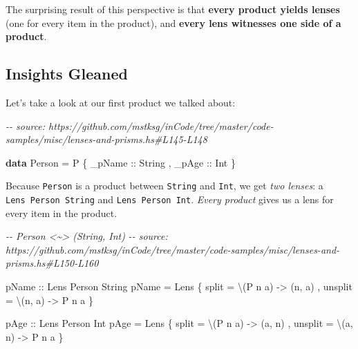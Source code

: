 \documentclass[]{article}
\newenvironment{Shaded}{}{}
\newcommand{\CommentTok}[1]{\textcolor[rgb]{0.38,0.63,0.69}{\textit{#1}}}
\newcommand{\DataTypeTok}[1]{\textcolor[rgb]{0.56,0.13,0.00}{#1}}
\newcommand{\KeywordTok}[1]{\textcolor[rgb]{0.00,0.44,0.13}{\textbf{#1}}}
\newcommand{\NormalTok}[1]{#1}
\newcommand{\OtherTok}[1]{\textcolor[rgb]{0.00,0.44,0.13}{#1}}
\begin{document}
The surprising result of this perspective is that \textbf{every product yields
lenses} (one for every item in the product), and \textbf{every lens witnesses
one side of a product}.

\hypertarget{insights-gleaned}{%
\subsection{Insights Gleaned}\label{insights-gleaned}}

Let's take a look at our first product we talked about:

\begin{Shaded}
\begin{Highlighting}[]
\CommentTok{{-}{-} source: https://github.com/mstksg/inCode/tree/master/code{-}samples/misc/lenses{-}and{-}prisms.hs\#L145{-}L148}

\KeywordTok{data} \DataTypeTok{Person} \OtherTok{=} \DataTypeTok{P}
\NormalTok{    \{}\OtherTok{ \_pName ::} \DataTypeTok{String}
\NormalTok{    ,}\OtherTok{ \_pAge  ::} \DataTypeTok{Int}
\NormalTok{    \}}
\end{Highlighting}
\end{Shaded}

Because \texttt{Person} is a product between \texttt{String} and \texttt{Int},
we get \emph{two lenses}: a \texttt{Lens\textquotesingle{}\ Person\ String} and
\texttt{Lens\textquotesingle{}\ Person\ Int}. \emph{Every product} gives us a
lens for every item in the product.

\begin{Shaded}
\begin{Highlighting}[]
\CommentTok{{-}{-} Person <\textasciitilde{}> (String, Int)}
\CommentTok{{-}{-} source: https://github.com/mstksg/inCode/tree/master/code{-}samples/misc/lenses{-}and{-}prisms.hs\#L150{-}L160}

\OtherTok{pName ::} \DataTypeTok{Lens\textquotesingle{}} \DataTypeTok{Person} \DataTypeTok{String}
\NormalTok{pName }\OtherTok{=} \DataTypeTok{Lens\textquotesingle{}}
\NormalTok{    \{ split   }\OtherTok{=}\NormalTok{ \textbackslash{}(}\DataTypeTok{P}\NormalTok{ n a) }\OtherTok{{-}>}\NormalTok{ (n, a)}
\NormalTok{    , unsplit }\OtherTok{=}\NormalTok{ \textbackslash{}(n, a)  }\OtherTok{{-}>} \DataTypeTok{P}\NormalTok{ n a}
\NormalTok{    \}}

\OtherTok{pAge ::} \DataTypeTok{Lens\textquotesingle{}} \DataTypeTok{Person} \DataTypeTok{Int}
\NormalTok{pAge }\OtherTok{=} \DataTypeTok{Lens\textquotesingle{}}
\NormalTok{    \{ split   }\OtherTok{=}\NormalTok{ \textbackslash{}(}\DataTypeTok{P}\NormalTok{ n a) }\OtherTok{{-}>}\NormalTok{ (a, n)}
\NormalTok{    , unsplit }\OtherTok{=}\NormalTok{ \textbackslash{}(a, n)  }\OtherTok{{-}>} \DataTypeTok{P}\NormalTok{ n a}
\NormalTok{    \}}
\end{Highlighting}
\end{Shaded}
\end{document}
